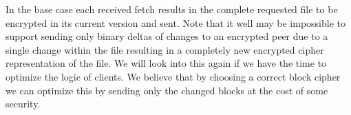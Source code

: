 In the base case each received fetch results in the complete requested file to be encrypted in its current version and sent.
Note that it well may be impossible to support sending only binary deltas of changes to an encrypted peer due to a single change within the file resulting in a completely new encrypted cipher representation of the file.
We will look into this again if we have the time to optimize the logic of clients.
We believe that by choosing a correct block cipher we can optimize this by sending only the changed blocks at the cost of some security.

